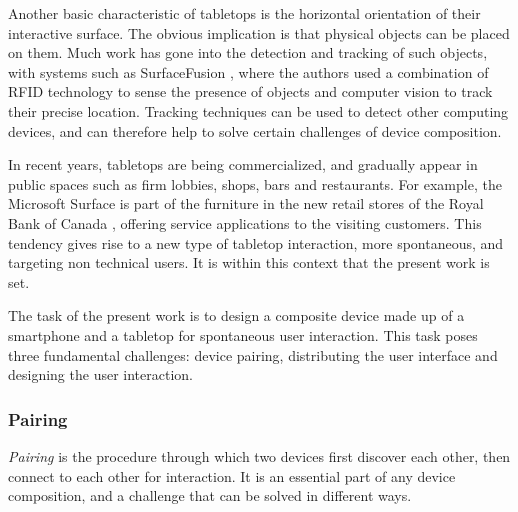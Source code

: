 Another basic characteristic of tabletops is the horizontal orientation of their interactive surface.
The obvious implication is that physical objects can be placed on them.
Much work has gone into the detection and tracking of such objects, with systems such as SurfaceFusion \citep{Olwal:2008:surfacefusion}, where the authors used a combination of RFID technology to sense the presence of objects and computer vision to track their precise location.
Tracking techniques can be used to detect other computing devices, and can therefore help to solve certain challenges of device composition.

%

In recent years, tabletops are being commercialized, and gradually appear in public spaces such as firm lobbies, shops, bars and restaurants.
For example, the Microsoft Surface is part of the furniture in the new retail stores of the Royal Bank of Canada \citep{mscase}, offering service applications to the visiting customers.
This tendency gives rise to a new type of tabletop interaction, more spontaneous, and targeting non technical users.
It is within this context that the present work is set.

The task of the present work is to design a composite device made up of a smartphone and a tabletop for spontaneous user interaction.
This task poses three fundamental challenges: device pairing, distributing the user interface and designing the user interaction.

\subsubsection{Pairing}

\emph{Pairing} is the procedure through which two devices first discover each other, then connect to each other for interaction.
It is an essential part of any device composition, and a challenge that can be solved in different ways.

